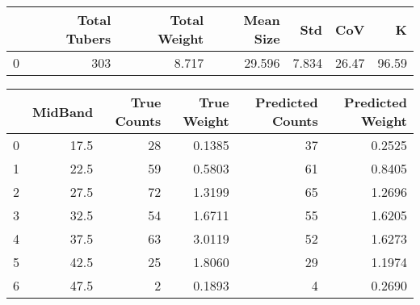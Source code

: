 \begin{tabular}{lrrrrrr}
\toprule
{} &  Total Tubers &  Total Weight &  Mean Size &    Std &    CoV &      K \\
\midrule
0 &           303 &         8.717 &     29.596 &  7.834 &  26.47 &  96.59 \\
\bottomrule
\end{tabular}

\begin{tabular}{lrrrrr}
\toprule
{} &  MidBand &  True Counts &  True Weight &  Predicted Counts &  Predicted Weight \\
\midrule
0 &     17.5 &           28 &       0.1385 &                37 &            0.2525 \\
1 &     22.5 &           59 &       0.5803 &                61 &            0.8405 \\
2 &     27.5 &           72 &       1.3199 &                65 &            1.2696 \\
3 &     32.5 &           54 &       1.6711 &                55 &            1.6205 \\
4 &     37.5 &           63 &       3.0119 &                52 &            1.6273 \\
5 &     42.5 &           25 &       1.8060 &                29 &            1.1974 \\
6 &     47.5 &            2 &       0.1893 &                 4 &            0.2690 \\
\bottomrule
\end{tabular}

